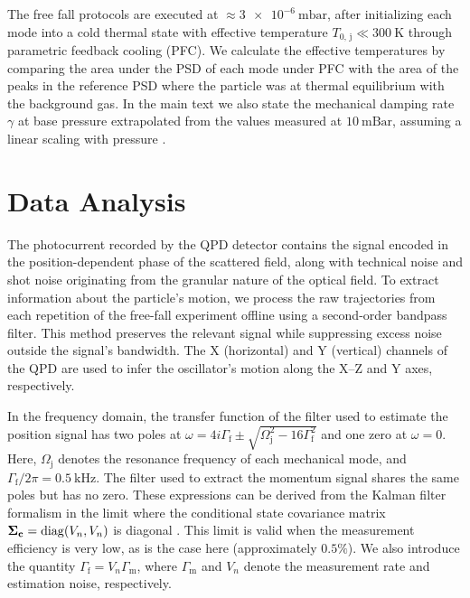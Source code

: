 \documentclass[aps,amssymb,amsmath,prb,superscriptaddress,reprint,notitlepage,onecolumn]{revtex4-1}
\newcommand{\<}{\langle}
\renewcommand{\>}{\rangle}
\begin{document}
The free fall protocols are executed at $\approx \SI{3e-6}{\milli\bar}$, after initializing each mode into a cold thermal state with effective temperature $T_\text{0, j} \ll \SI{300}{\kelvin}$ through parametric feedback cooling (PFC).
%
We calculate the effective temperatures by comparing the area under the PSD of each mode under PFC with the area of the peaks in the reference PSD where the particle was at thermal equilibrium with the background gas.
%
In the main text we also state the mechanical damping rate $\gamma$ at base pressure extrapolated from the values measured at $10~\mathrm{mBar}$, assuming a linear scaling with pressure \cite{Hebestreit2018calibration}. 


\section{Data Analysis}\label{app:DataAnalysis}

The photocurrent recorded by the QPD detector contains the signal encoded in the position-dependent phase of the scattered field, along with technical noise and shot noise originating from the granular nature of the optical field.
%
To extract information about the particle's motion, we process the raw trajectories from each repetition of the free-fall experiment offline using a second-order bandpass filter.
%
This method preserves the relevant signal while suppressing excess noise outside the signal’s bandwidth.
%
The X (horizontal) and Y (vertical) channels of the QPD are used to infer the oscillator’s motion along the X–Z and Y axes, respectively.


In the frequency domain, the transfer function of the filter used to estimate the position signal has two poles at $\omega = 4i\Gamma_\text{f} \pm \sqrt{\Omega_\text{j}^2 - 16\Gamma_\text{f}^2}$ and one zero at $\omega = 0$.
%
Here, $\Omega_\text{j}$ denotes the resonance frequency of each mechanical mode, and $\Gamma_\text{f}/2\pi = 0.5~\mathrm{kHz}$. 
%
The filter used to extract the momentum signal shares the same poles but has no zero.
%
These expressions can be derived from the Kalman filter formalism in the limit where the conditional state covariance matrix $\vb{\Sigma_c} = \mathrm{diag}(V_n, V_n)$ is diagonal \cite{Wiseman2009, Meng2020}.
%
This limit is valid when the measurement efficiency is very low, as is the case here (approximately $0.5\%$).
%
We also introduce the quantity $\Gamma_\text{f} = V_n \Gamma_\text{m}$, where $\Gamma_\text{m}$ and $V_n$ denote the measurement rate and estimation noise, respectively.
\end{document}
